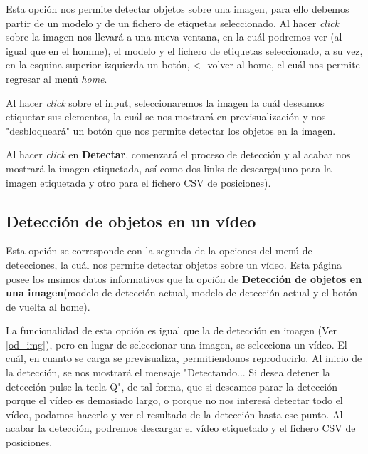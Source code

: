 
Esta opción nos permite detectar objetos sobre una imagen, para ello debemos partir de un modelo y de un fichero de etiquetas seleccionado.
Al hacer \textit{click} sobre la imagen nos llevará a una nueva ventana, en la cuál podremos ver (al igual que en el homme), el modelo y el fichero de etiquetas seleccionado, 
a su vez, en la esquina superior izquierda un botón, <- volver al home, el cuál nos permite regresar al menú \textit{home}.


Al hacer \textit{click} sobre el input, seleccionaremos la imagen la cuál deseamos etiquetar sus elementos, la cuál se nos mostrará en previsualización y nos "desbloqueará" un botón que nos permite detectar los objetos en la imagen.


Al hacer \textit{click} en \textbf{Detectar}, comenzará el proceso de detección y al acabar nos mostrará la imagen etiquetada, así como dos links de descarga(uno para la imagen etiquetada y otro para el fichero CSV de posiciones).


\subsection{Detección de objetos en un vídeo} \label{odVideo}
Esta opción se corresponde con la segunda de la opciones del menú de detecciones, la cuál nos permite detectar objetos sobre un vídeo.
Esta página posee los msimos datos informativos que la opción de \textbf{Detección de objetos en una imagen}(modelo de detección actual, modelo de detección actual y el botón de vuelta al home).


La funcionalidad de esta opción es igual que la de detección en imagen (Ver \ref{od_img}), pero en lugar de seleccionar una imagen, se selecciona un vídeo.
El cuál, en cuanto se carga se previsualiza, permitiendonos reproducirlo. Al inicio de la detección, se nos mostrará el mensaje "Detectando... Si desea detener la detección pulse la tecla Q", de tal forma, que si deseamos parar la detección porque el vídeo es demasiado largo, 
o porque no nos interesá detectar todo el vídeo, podamos hacerlo y ver el resultado de la detección hasta ese punto. Al acabar la detección, podremos descargar el vídeo etiquetado y el fichero CSV de posiciones.


